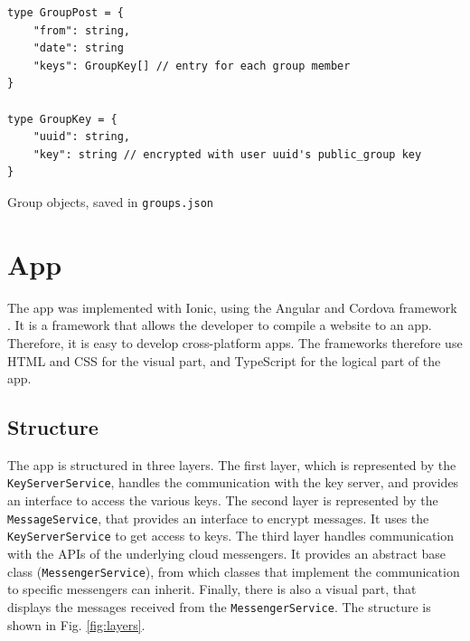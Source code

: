 \documentclass[a4paper, oneside]{discothesis}
\begin{document}
\begin{listing}[h!]
\begin{verbatim}
type GroupPost = {
    "from": string,
    "date": string
    "keys": GroupKey[] // entry for each group member
}

type GroupKey = {
    "uuid": string,
    "key": string // encrypted with user uuid's public_group key
}
\end{verbatim}
\caption{Group objects, saved in \texttt{groups.json}}
\label{lst:groups}
\end{listing}

\section{App}

The app was implemented with Ionic, using the Angular and Cordova framework \cite{Ionic}. It is a framework that allows the developer to compile a website to an app. Therefore, it is easy to develop cross-platform apps. The frameworks therefore use HTML and CSS for the visual part, and TypeScript for the logical part of the app.

\subsection{Structure}

The app is structured in three layers. The first layer, which is represented by the \texttt{KeyServerService}, handles the communication with the key server, and provides an interface to access the various keys. The second layer is represented by the \texttt{MessageService}, that provides an interface to encrypt messages. It uses the \texttt{KeyServerService} to get access to keys. The third layer handles communication with the APIs of the underlying cloud messengers. It provides an abstract base class (\texttt{MessengerService}), from which classes that implement the communication to specific messengers can inherit. Finally, there is also a visual part, that displays the messages received from the \texttt{MessengerService}. The structure is shown in Fig. \ref{fig:layers}.
\end{document}
